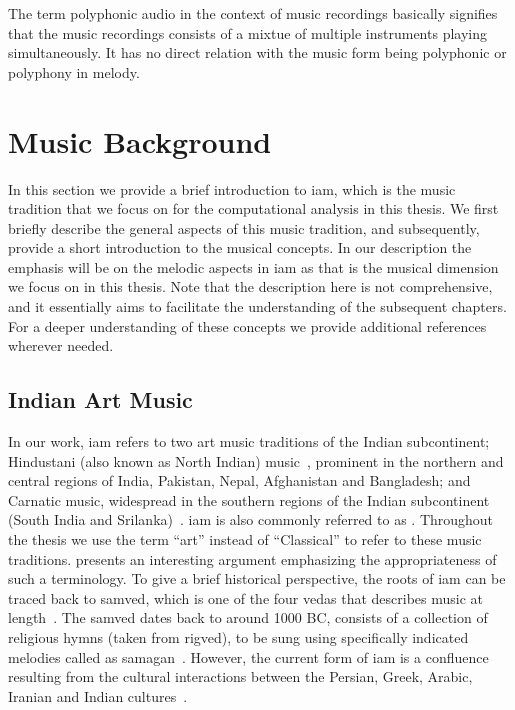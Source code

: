 The term polyphonic audio in the context of music recordings basically signifies that the music recordings consists of a mixtue of multiple instruments playing simultaneously. It has no direct relation with the music form being polyphonic or polyphony in melody. 


\section{Music Background}
\label{sec:music_background}

In this section we provide a brief introduction to \gls{iam}, which is the music tradition that we focus on for the computational analysis in this thesis. We first briefly describe the general aspects of this  music tradition, and subsequently, provide a short introduction to the musical concepts. In our description the emphasis will be on the melodic aspects in \gls{iam} as that is the musical dimension we focus on in this thesis. Note that the description here is not comprehensive, and it essentially aims to facilitate the understanding of the subsequent chapters. For a deeper understanding of these concepts we provide additional references wherever needed. 

\subsection{Indian Art Music}
\label{sec:music_background_iam}

In our work, \acrfull{iam} refers to two art music traditions of the Indian subcontinent; Hindustani (also known as North Indian) music~\citep{Bor2010, Danielou2010}, prominent in the northern and central regions of India, Pakistan, Nepal, Afghanistan and Bangladesh; and Carnatic music, widespread in the southern regions of the Indian subcontinent (South India and Srilanka)~\citep{Singh1995,Viswanathan2004}. \gls{iam} is also commonly referred to as . Throughout the thesis we use the term ``art'' instead of ``Classical'' to refer to these music traditions. \cite[Page 1]{Raja2012} presents an interesting argument emphasizing the appropriateness of such a terminology. To give a brief historical perspective, the roots of \gls{iam} can be traced back to \gls{samved}, which is one of the four \gls{vedas} that describes music at length~\citep{Trivedi2008,Singh1995}. The \gls{samved} dates back to around 1000 BC, consists of a collection of religious hymns (taken from \gls{rigved}), to be sung using specifically indicated melodies called as \gls{samagan}~\citep{Griffith2004}. However, the current form of \gls{iam} is a confluence resulting from the cultural interactions between the Persian, Greek, Arabic, Iranian and Indian cultures~\citep{Kaul2007,Saraf2011,Singh1995}.

